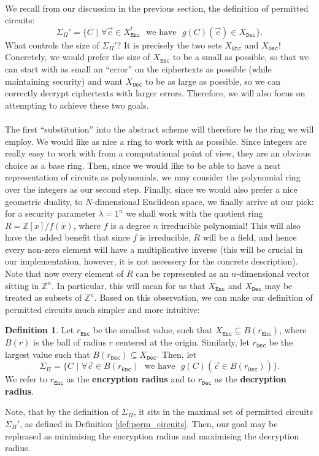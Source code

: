 \documentclass{article}
\theoremstyle{definition}
\newtheorem{definition}{Definition}[section]
\theoremstyle{example}
\newcommand{\Enc}{\texttt{Enc}}
\newcommand{\Dec}{\texttt{Dec}}
\newcommand{\Int}{\mathbb{Z}}
\begin{document}
\paragraph{} We recall from our discussion in the previous section, the
definition of permitted circuits:
\[
  \Sigma_\Pi' = \{C\,\,|\,\, \forall \vec{c} \in X_\Enc^t\,\,\text{ we
    have }\,\,g(C)(\vec{c}) \in X_\Dec\}.
\]
What controls the size of $\Sigma_\Pi'$? It is precisely the two sets $X_\Enc$
and $X_\Dec$! Concretely, we would prefer the size of $X_\Enc$ to be a small as
possible, so that we can start with as small an ``error'' on the ciphertexts as
possible (while maintaining security) and want $X_\Dec$ to be as large as
possible, so we can correctly decrypt ciphertexts with larger errors. Therefore,
we will also focus on attempting to achieve these two goals.
\paragraph{} The first ``substitution'' into the abstract scheme will therefore
be the ring we will employ. We would like as nice a ring to work with as
possible. Since integers are really easy to work with from a computational
point of view, they are an obvious choice as a base ring. Then, since we would
like to be able to have a neat representation of circuits as polynomials, we may
consider the polynomial ring over the integers as our second step. Finally,
since we would also prefer a nice geometric duality, to $N$-dimensional
Euclidean space, we finally arrive at our pick: for a security parameter
$\lambda = 1^n$ we shall work with the quotient ring $R = \Int[x]/f(x)$, where
$f$ is a degree $n$ irreducible polynomial! This will also have the added
benefit that since $f$ is irreducible, $R$ will be a field, and hence every
non-zero element will have a multiplicative inverse (this will be crucial in our
implementation, however, it is not necessery for the concrete description). Note
that now every element of $R$ can be represented as an $n$-dimensional vector
sitting in $\Int^n$. In particular, this will mean for us that $X_\Enc$ and
$X_\Dec$ may be treated as subsets of $\Int^n$. Based on this observation, we
can make our definition of permitted circuits much simpler and more intuitive:
\begin{definition}
  Let $r_\Enc$ be the smallest value, such that $X_\Enc \subseteq B(r_\Enc)$,
  where $B(r)$ is the ball of radius $r$ centered at the origin. Similarly, let
  $r_\Dec$ be the largest value such that $B(r_\Dec) \subseteq X_\Dec$. Then, let
  \[
    \Sigma_\Pi = \{C\,\,|\,\,\forall \vec{c} \in B(r_\Enc)\,\,\text{ we have
    }\,\,g(C)(\vec{c} \in B(r_\Dec))\}.
  \]
  We refer to $r_\Enc$ as the \textbf{encryption radius} and to $r_\Dec$ as the
  \textbf{decryption radius}.
\end{definition}
Note, that by the definition of $\Sigma_\Pi$, it sits in the maximal set of
permitted circuits $\Sigma_\Pi'$, as defined in Definition
\ref{def:perm_circuits}. Then, our goal may be rephrased as minimising the
encryption radius and maximising the decryption radius.
\end{document}
